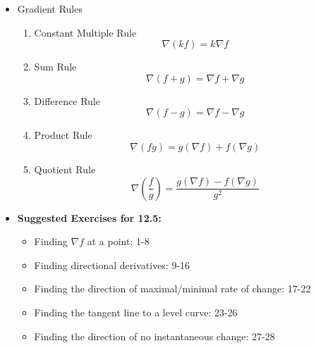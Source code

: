 \documentclass[12pt]{article}
\newcommand{\ds}{\displaystyle}
\renewcommand{\vec}[1]{\mathbf{#1}}
\newcommand{\<}{\left<}
\renewcommand{\>}{\right>}
\begin{document}
\begin{itemize}
  \newpage

  \item Gradient Rules
  
      \begin{enumerate}
      \item Constant Multiple Rule
      \[\nabla(kf)=k\nabla f\]
      \item Sum Rule
      \[\nabla(f+g)=\nabla f+\nabla g\]
      \item Difference Rule
      \[\nabla(f-g)=\nabla f-\nabla g\]
      \item Product Rule
      \[\nabla(fg)=g(\nabla f)+f(\nabla g)\]
      \item Quotient Rule
      \[\nabla\left(\frac{f}{g}\right)=\frac{g(\nabla f)-f(\nabla g)}{g^2}\]
      \end{enumerate}
  
  \item \textbf{Suggested Exercises for 12.5:}
  
    \begin{itemize}
    \item Finding $\nabla f$ at a point: 1-8
    \item Finding directional derivatives: 9-16
    \item Finding the direction of maximal/minimal rate of change: 17-22
    \item Finding the tangent line to a level curve: 23-26
    \item Finding the direction of no instantaneous change: 27-28
    \end{itemize}
  
  \end{itemize}
  
  
  
  
    
  
  
    
\end{document}
